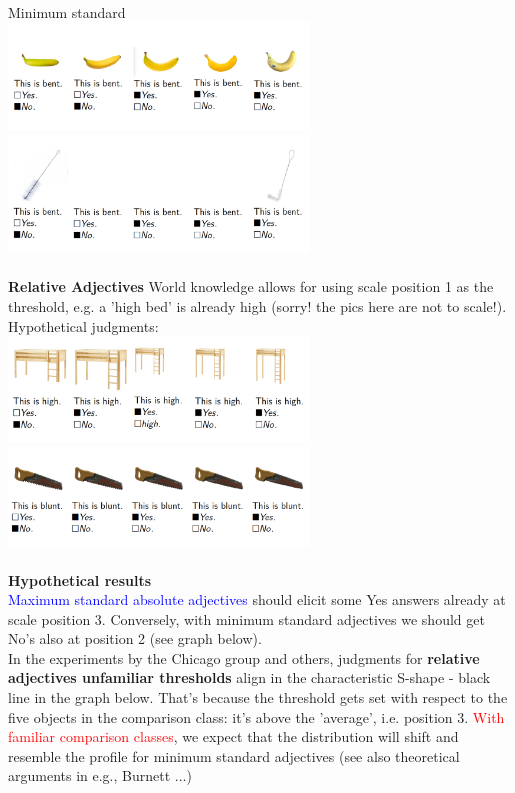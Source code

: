 \documentclass[fleqn,reqno,10pt]{article}
\begin{document}
\\
\textcolor{OliveGreen}{Minimum standard}\\
\includegraphics[width=8cm]{images/this_is-bent_banana.png}
\\
\includegraphics[width=8cm]{images/this_is-bent_brush.png}
\\
\\
\textbf{Relative Adjectives}
World knowledge allows for using scale position 1 as the threshold, e.g. a 'high bed' is already high {\small(sorry! the pics here are not to scale!)}. Hypothetical judgments:\\
\includegraphics[width=8cm]{images/this_is-high-bed.png}
\\
\includegraphics[width=8cm]{images/this_is-blunt_saw.png}
\\
\\
\textbf{Hypothetical results}\\
\textcolor{blue}{Maximum standard absolute adjectives} should elicit some Yes answers already at scale position 3. Conversely, with \textcolor{OliveGreen}{minimum standard adjectives} we should get No's also at position 2 (see graph below). \\
In the experiments by the Chicago group and others, judgments for \textbf{relative adjectives unfamiliar thresholds} align in the characteristic S-shape - black line in the graph below. That's because the threshold gets set with respect to the five objects in the comparison class: it's above the 'average', i.e. position 3. \textcolor{red}{With familiar comparison classes}, we expect that the distribution will shift and resemble the profile for minimum standard adjectives (see also theoretical arguments in e.g., Burnett ...) \\
\end{document}
